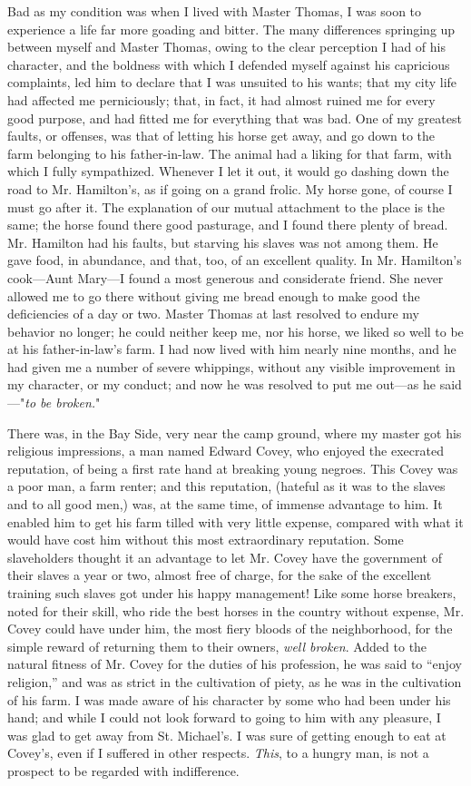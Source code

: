 Bad as my condition was when I lived with Master Thomas, I was soon to
experience a life far more goading and bitter. The many differences
springing up between myself and Master Thomas, owing to the clear
perception I had of his character, and the boldness with which I
defended myself against his capricious complaints, led him to declare
that I was unsuited to his wants; that my city life had affected me
perniciously; that, in fact, it had almost ruined me for every good
purpose, and had fitted me for everything that was bad. One of my
greatest faults, or offenses, was that of letting his horse get away,
and go down to the farm belonging to his father-in-law. The animal had a
liking for that farm, with which I fully sympathized. Whenever I let it
out, it would go dashing down the road to Mr. Hamilton's, as if going on
a grand frolic. My horse gone, of course I must go after it. The
explanation of our mutual attachment to the place is the same; the horse
found there good pasturage, and I found there plenty of bread. Mr.
Hamilton had his faults, but starving his slaves was not among them. He
gave food, in abundance, and that, too, of an excellent quality. In Mr.
Hamilton's cook---Aunt Mary---I found a most generous and considerate
friend. She never allowed me to go {}there without giving me bread
enough to make good the deficiencies of a day or two. Master Thomas at
last resolved to endure my behavior no longer; he could neither keep me,
nor his horse, we liked so well to be at his father-in-law's farm. I had
now lived with him nearly nine months, and he had given me a number of
severe whippings, without any visible improvement in my character, or my
conduct; and now he was resolved to put me out---as he said---"\emph{to
be broken.}"

There was, in the Bay Side, very near the camp ground, where my master
got his religious impressions, a man named Edward Covey, who enjoyed the
execrated reputation, of being a first rate hand at breaking young
negroes. This Covey was a poor man, a farm renter; and this reputation,
(hateful as it was to the slaves and to all good men,) was, at the same
time, of immense advantage to him. It enabled him to get his farm tilled
with very little expense, compared with what it would have cost him
without this most extraordinary reputation. Some slaveholders thought it
an advantage to let Mr. Covey have the government of their slaves a year
or two, almost free of charge, for the sake of the excellent training
such slaves got under his happy management! Like some horse breakers,
noted for their skill, who ride the best horses in the country without
expense, Mr. Covey could have under him, the most fiery bloods of the
neighborhood, for the simple reward of returning them to their owners,
\emph{well broken}. Added to the natural fitness of Mr. Covey for the
duties of his profession, he was said to ``enjoy religion,'' {}and was
as strict in the cultivation of piety, as he was in the cultivation of
his farm. I was made aware of his character by some who had been under
his hand; and while I could not look forward to going to him with any
pleasure, I was glad to get away from St. Michael's. I was sure of
getting enough to eat at Covey's, even if I suffered in other respects.
\emph{This}, to a hungry man, is not a prospect to be regarded with
indifference.
